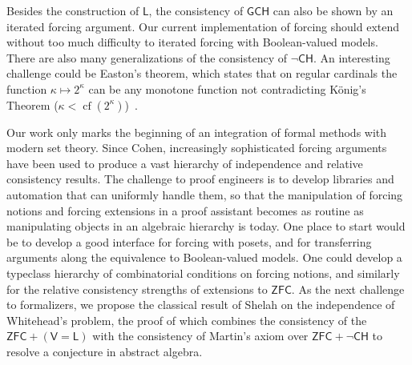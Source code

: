 \documentclass[sigplan,screen]{acmart}
\newcommand{\ZFC}{\mathsf{ZFC}}
\newcommand{\CH}{\mathsf{CH}}
\theoremstyle{definition}
\DeclareMathOperator{\cf}{cf}
\begin{document}

Besides the construction of \(\mathsf{L}\), the consistency of $\mathsf{GCH}$ can also be shown by an iterated forcing argument. Our current implementation of forcing should extend without too much difficulty to iterated forcing with Boolean-valued models. There are also many generalizations of the consistency of $\neg \mathsf{CH}$.
An interesting challenge could be Easton's theorem, which states that on regular cardinals the function $\kappa\mapsto 2^\kappa$ can be any monotone function not contradicting K\"onig's Theorem ($\kappa<\cf(2^\kappa)$)~\cite{easton1970powers}.

Our work only marks the beginning of an integration of formal methods with modern set theory. Since Cohen, increasingly sophisticated forcing arguments have been used to produce a vast hierarchy of independence and relative consistency results. The challenge to proof engineers is to develop libraries and automation that can uniformly handle them, so that the manipulation of forcing notions and forcing extensions in a proof assistant becomes as routine as manipulating objects in an algebraic hierarchy is today. One place to start would be to develop a good interface for forcing with posets, and for transferring arguments along the equivalence to Boolean-valued models. One could develop a typeclass hierarchy of combinatorial conditions on forcing notions, and similarly for the relative consistency strengths of extensions to \(\ZFC\).
As the next challenge to formalizers, we propose the classical result of Shelah \cite{shelah1974infinite} on the independence of Whitehead's problem, the proof of which combines the consistency of the \(\mathsf{ZFC} + (\mathsf{V} = \mathsf{L})\) with the consistency of Martin's axiom \cite{martin1970internal} over \(\ZFC + \neg \CH\) to resolve a conjecture in abstract algebra.

\end{document}
